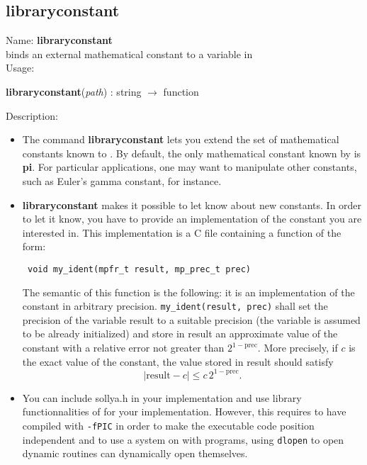 \subsection{libraryconstant}
\label{lablibraryconstant}
\noindent Name: \textbf{libraryconstant}\\
binds an external mathematical constant to a variable in \sollya\\
\noindent Usage: 
\begin{center}
\textbf{libraryconstant}(\emph{path}) : \textsf{string} $\rightarrow$ \textsf{function}\\
\end{center}
\noindent Description: \begin{itemize}

\item The command \textbf{libraryconstant} lets you extend the set of mathematical
   constants known to \sollya.
   By default, the only mathematical constant known by \sollya is \textbf{pi}.
   For particular applications, one may want to
   manipulate other constants, such as Euler's gamma constant, for instance.

\item \textbf{libraryconstant} makes it possible to let \sollya know about new constants.
   In order to let it know, you have to provide an implementation of the
   constant you are interested in. This implementation is a C file containing
   a function of the form:
   \begin{verbatim} void my_ident(mpfr_t result, mp_prec_t prec)\end{verbatim}
   The semantic of this function is the following: it is an implementation of
   the constant in arbitrary precision.
   \verb|my_ident(result, prec)| shall set the
   precision of the variable result to a suitable precision (the variable is
   assumed to be already initialized) and store in result an approximate value
   of the constant with a relative error not greater than $2^{1-\mathrm{prec}}$.
   More precisely, if $c$ is the exact value of the constant, the value stored
   in result should satisfy $$|\mathrm{result}-c| \le c\,2^{1-\mathrm{prec}}.$$

\item You can include sollya.h in your implementation and use library 
   functionnalities of \sollya for your implementation. However, this requires to
   have compiled \sollya with \texttt{-fPIC} in order to make the \sollya executable
   code position independent and to use a system on with programs, using \texttt{dlopen}
   to open dynamic routines can dynamically open themselves.


\end{itemize}
